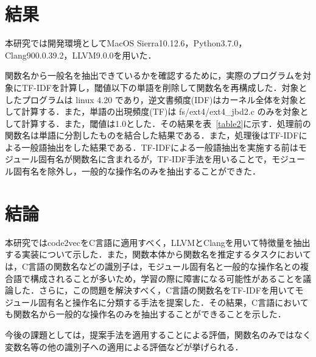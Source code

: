 \documentclass[submit,techrep,noauthor]{ipsj}
\begin{document}
\section{結果}
本研究では開発環境としてMacOS Sierra10.12.6，Python3.7.0，Clang900.0.39.2，LLVM9.0.0を用いた．

関数名から一般名を抽出できているかを確認するために，実際のプログラムを対象にTF-IDFを計算し，閾値以下の単語を削除して関数名を再構成した．対象としたプログラムは linux 4.20 であり，逆文書頻度(IDF)はカーネル全体を対象として計算する．また，単語の出現頻度(TF)は fs/ext4/ext4\_jbd2.c のみを対象として計算する．また，閾値は1.0とした．その結果を表~\ref{table2}に示す．処理前の関数名は単語に分割したものを結合した結果である．また，処理後はTF-IDFによる一般語抽出をした結果である．TF-IDFによる一般語抽出を実施する前はモジュール固有名が関数名に含まれるが，TF-IDF手法を用いることで，モジュール固有名を除外し，一般的な操作名のみを抽出することができた．

\section{結論}
本研究ではcode2vecをC言語に適用すべく，LLVMとClang\cite{lattner2007clang}を用いて特徴量を抽出する実装について示した．また，関数本体から関数名を推定するタスクにおいては，C言語の関数名などの識別子は，モジュール固有名と一般的な操作名との複合語で構成されることが多いため，学習の際に障害になる可能性があることを議論した．さらに，この問題を解決すべく，C言語の関数名をTF-IDFを用いてモジュール固有名と操作名に分類する手法を提案した．その結果，C言語においても関数名から一般的な操作名のみを抽出することができることを示した．

今後の課題としては，提案手法を適用することによる評価，関数名のみではなく変数名等の他の識別子への適用による評価などが挙げられる．





\end{document}

